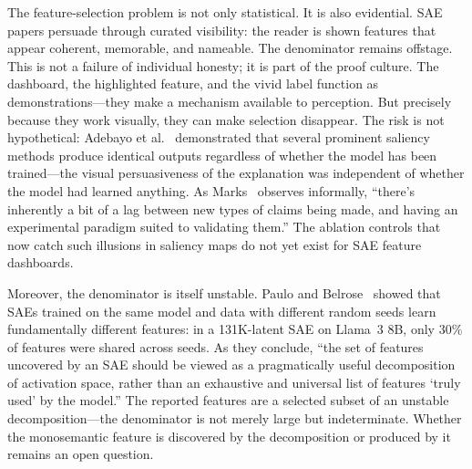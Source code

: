 \documentclass{article}
\begin{document}
The feature-selection problem is not only statistical. It is also evidential. SAE papers persuade through curated visibility: the reader is shown features that appear coherent, memorable, and nameable. The denominator remains offstage. This is not a failure of individual honesty; it is part of the proof culture. The dashboard, the highlighted feature, and the vivid label function as demonstrations---they make a mechanism available to perception. But precisely because they work visually, they can make selection disappear. The risk is not hypothetical: Adebayo et al.~\citep{adebayo_sanity_2018} demonstrated that several prominent saliency methods produce identical outputs regardless of whether the model has been trained---the visual persuasiveness of the explanation was independent of whether the model had learned anything. As Marks~\citep{marks_illusory_2025} observes informally, ``there's inherently a bit of a lag between new types of claims being made, and having an experimental paradigm suited to validating them.'' The ablation controls that now catch such illusions in saliency maps do not yet exist for SAE feature dashboards.

Moreover, the denominator is itself unstable. Paulo and Belrose~\citep{paulo_belrose_seeds_2026} showed that SAEs trained on the same model and data with different random seeds learn fundamentally different features: in a 131K-latent SAE on Llama~3 8B, only 30\% of features were shared across seeds. As they conclude, ``the set of features uncovered by an SAE should be viewed as a pragmatically useful decomposition of activation space, rather than an exhaustive and universal list of features `truly used' by the model.'' The reported features are a selected subset of an unstable decomposition---the denominator is not merely large but indeterminate. Whether the monosemantic feature is discovered by the decomposition or produced by it remains an open question.
\end{document}
